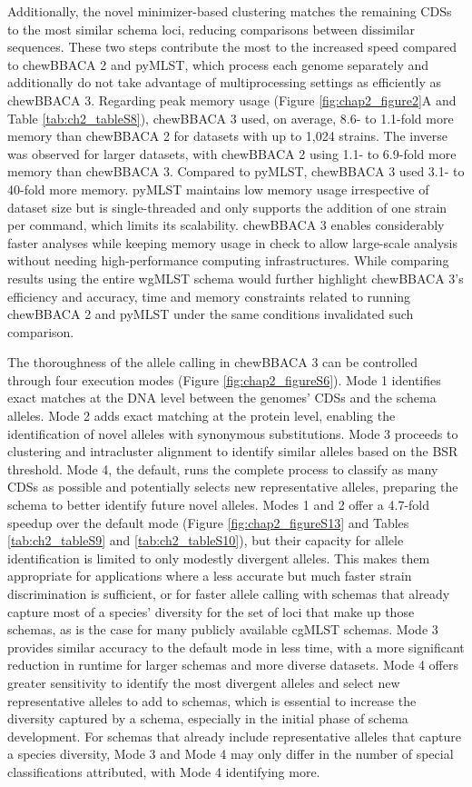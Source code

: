 Additionally, the novel minimizer-based clustering matches the remaining \ac{CDSs} to the most similar schema loci, reducing comparisons between dissimilar sequences. These two steps contribute the most to the increased speed compared to chewBBACA 2 and pyMLST, which process each genome separately and additionally do not take advantage of multiprocessing settings as efficiently as chewBBACA 3. Regarding peak memory usage (Figure \ref{fig:chap2_figure2}A and Table \ref{tab:ch2_tableS8}), chewBBACA 3 used, on average, 8.6- to 1.1-fold more memory than chewBBACA 2 for datasets with up to 1,024 strains. The inverse was observed for larger datasets, with chewBBACA 2 using 1.1- to 6.9-fold more memory than chewBBACA 3. Compared to pyMLST, chewBBACA 3 used 3.1- to 40-fold more memory. pyMLST maintains low memory usage irrespective of dataset size but is single-threaded and only supports the addition of one strain per command, which limits its scalability. chewBBACA 3 enables considerably faster analyses while keeping memory usage in check to allow large-scale analysis without needing high-performance computing infrastructures. While comparing results using the entire \ac{wgMLST} schema would further highlight chewBBACA 3’s efficiency and accuracy, time and memory constraints related to running chewBBACA 2 and pyMLST under the same conditions invalidated such comparison.

The thoroughness of the allele calling in chewBBACA 3 can be controlled through four execution modes (Figure \ref{fig:chap2_figureS6}). Mode 1 identifies exact matches at the \ac{DNA} level between the genomes’ \ac{CDSs} and the schema alleles. Mode 2 adds exact matching at the protein level, enabling the identification of novel alleles with synonymous substitutions. Mode 3 proceeds to clustering and intracluster alignment to identify similar alleles based on the \ac{BSR} threshold. Mode 4, the default, runs the complete process to classify as many \ac{CDSs} as possible and potentially selects new representative alleles, preparing the schema to better identify future novel alleles. Modes 1 and 2 offer a 4.7-fold speedup over the default mode (Figure \ref{fig:chap2_figureS13} and Tables \ref{tab:ch2_tableS9} and \ref{tab:ch2_tableS10}), but their capacity for allele identification is limited to only modestly divergent alleles. This makes them appropriate for applications where a less accurate but much faster strain discrimination is sufficient, or for faster allele calling with schemas that already capture most of a species’ diversity for the set of loci that make up those schemas, as is the case for many publicly available \ac{cgMLST} schemas. Mode 3 provides similar accuracy to the default mode in less time, with a more significant reduction in runtime for larger schemas and more diverse datasets. Mode 4 offers greater sensitivity to identify the most divergent alleles and select new representative alleles to add to schemas, which is essential to increase the diversity captured by a schema, especially in the initial phase of schema development. For schemas that already include representative alleles that capture a species diversity, Mode 3 and Mode 4 may only differ in the number of special classifications attributed, with Mode 4 identifying more.

